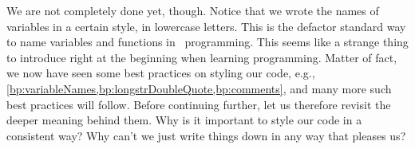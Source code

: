 We are not completely done yet, though.
Notice that we wrote the names of variables in a certain style, in lowercase letters.
This is the defactor standard way to name variables and functions in \python\ programming.%
%
%
This seems like a strange thing to introduce right at the beginning when learning programming.
Matter of fact, we now have seen some best practices on styling our code, e.g., \cref{bp:variableNames,bp:longstrDoubleQuote,bp:comments}, and many more such best practices will follow.
Before continuing further, let us therefore revisit the deeper meaning behind them.
Why is it important to style our code in a consistent way?
Why can't we just write things down in any way that pleases us?

